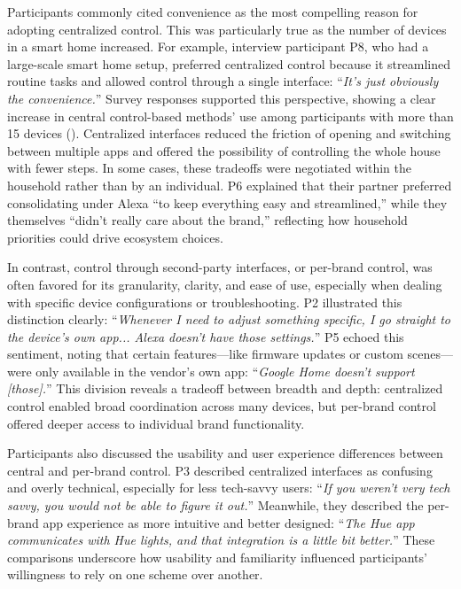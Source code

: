 Participants commonly cited convenience as the most compelling reason for adopting centralized control. This was particularly true as the number of devices in a smart home increased. For example, interview participant P8, who had a large-scale smart home setup, preferred centralized control because it streamlined routine tasks and allowed control through a single interface: ``\textit{It's just obviously the convenience.}'' Survey responses supported this perspective, showing a clear increase in central control-based methods' use among participants with more than 15 devices (). Centralized interfaces reduced the friction of opening and switching between multiple apps and offered the possibility of controlling the whole house with fewer steps.
In some cases, these tradeoffs were negotiated within the household rather than by an individual. P6 explained that their partner preferred consolidating under Alexa ``to keep everything easy and streamlined,'' while they themselves ``didn't really care about the brand,'' reflecting how household priorities could drive ecosystem choices.

In contrast, control through second-party interfaces, or per-brand control, was often favored for its granularity, clarity, and ease of use, especially when dealing with specific device configurations or troubleshooting. P2 illustrated this distinction clearly: ``\textit{Whenever I need to adjust something specific, I go straight to the device's own app... Alexa doesn't have those settings.}'' P5 echoed this sentiment, noting that certain features---like firmware updates or custom scenes---were only available in the vendor's own app: ``\textit{Google Home doesn't support [those].}'' This division reveals a tradeoff between breadth and depth: centralized control enabled broad coordination across many devices, but per-brand control offered deeper access to individual brand functionality.

Participants also discussed the usability and user experience differences between central and per-brand control. P3 described centralized interfaces as confusing and overly technical, especially for less tech-savvy users: ``\textit{If you weren't very tech savvy, you would not be able to figure it out.}'' Meanwhile, they described the per-brand app experience as more intuitive and better designed: ``\textit{The Hue app communicates with Hue lights, and that integration is a little bit better.}'' These comparisons underscore how usability and familiarity influenced participants' willingness to rely on one scheme over another.

